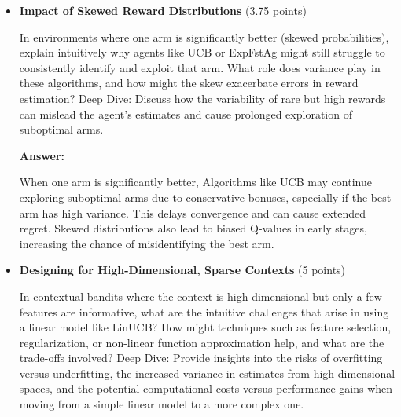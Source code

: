 \documentclass[12pt]{article}
\begin{document}
{{{\begin{itemize}[noitemsep]
    \textbf{Answer:}

    Bayesian methods like Thompson Sampling use prior distributions to model uncertainty, adapting exploration based on posterior updates. They can outperform frequentist methods when prior knowledge is informative or when adaptive exploration is beneficial. However, mis-specified priors can bias learning. Bayesian updates naturally adjust exploration over time by sampling from adjustable distributions, while frequentist methods use fixed bonuses or rules.

    \item \textbf{Impact of Skewed Reward Distributions} (3.75 points)
    
    \vspace{0.25cm}
    In environments where one arm is significantly better (skewed probabilities), explain intuitively why agents like UCB or ExpFstAg might still struggle to consistently identify and exploit that arm. What role does variance play in these algorithms, and how might the skew exacerbate errors in reward estimation?
    Deep Dive:
    Discuss how the variability of rare but high rewards can mislead the agent’s estimates and cause prolonged exploration of suboptimal arms.
    \vspace{0.5cm}

    \textbf{Answer:}

    When one arm is significantly better, Algorithms like UCB may continue exploring suboptimal arms due to conservative bonuses, especially if the best arm has high variance. This delays convergence and can cause extended regret. Skewed distributions also lead to biased Q-values in early stages, increasing the chance of misidentifying the best arm.

    \item \textbf{Designing for High-Dimensional, Sparse Contexts} (5 points)
    
    \vspace{0.25cm}
    In contextual bandits where the context is high-dimensional but only a few features are informative, what are the intuitive challenges that arise in using a linear model like LinUCB? How might techniques such as feature selection, regularization, or non-linear function approximation help, and what are the trade-offs involved?
    Deep Dive:
    Provide insights into the risks of overfitting versus underfitting, the increased variance in estimates from high-dimensional spaces, and the potential computational costs versus performance gains when moving from a simple linear model to a more complex one.
    \vspace{0.5cm}


\end{itemize}}}}
\end{document}
